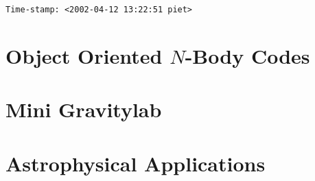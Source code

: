 \documentclass{book}
\begin{document}
  \frontmatter
\makebox[3.5in][s]{}\verb=Time-stamp: <2002-04-12 13:22:51 piet>=
%
%
%
%
%
%
    
  \mainmatter
      
    \part{Object Oriented $N$-Body Codes}
      
      
    \part{Mini Gravitylab}
      
      
    \part{Astrophysical Applications}
      
      
      
%      
%      
  \backmatter
\end{document}
